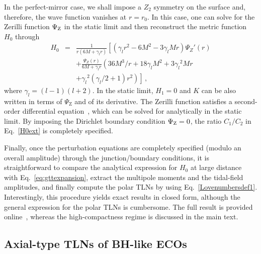 \documentclass[aps,twocolumn,showpacs,preprintnumbers,nofootinbib,prd,superscriptaddress,groupedaddress,10pt]{revtex4-1}
\def\nn{\nonumber}
\begin{document}
In the perfect-mirror case, we shall impose a $Z_2$ symmetry on the surface and, therefore, the wave function vanishes at $r=r_0$. In this case, one can solve for the Zerilli function $\Psi_{\rm Z}$ in the static limit and then reconstruct the metric function $H_0$ through~\cite{Zerilli:1970se}
\begin{eqnarray}
 H_0 &=& \frac{1}{r (6 M+{\gamma_l}  r)} \left[ \left({\gamma_l}  r^2-6 M^2-3 {\gamma_l}  M r\right) \Psi_Z'(r)\right.\nn\\
 &&\left.+\frac{\Psi_Z(r)}{6 M+{\gamma_l}  r} \left(36 M^3/r+18 {\gamma_l}  M^2+3 {\gamma_l} ^2 M r\right.\right.\nn\\
 &&\left.\left.+{\gamma_l} ^2 ({\gamma_l}/2 +1) r^2\right)\right]\,, 
\end{eqnarray}
where ${\gamma_l}=(l-1)(l+2)$. In the static limit, $H_1=0$ and $K$ can be also written in terms of $\Psi_\text{Z}$ and of its derivative. The Zerilli function satisfies a second-order differential equation~\cite{Zerilli:1970se}, which can be solved for analytically in the static limit.
By imposing the Dirichlet boundary condition $\Psi_{\rm Z}=0$, the ratio $C_1/C_2$ in Eq.~\eqref{H0ext} is completely specified.


Finally, once the perturbation equations are completely specified (modulo an overall amplitude) through the junction/boundary conditions, it is straightforward to compare the analytical expression for $H_0$ at large distance with Eq.~\eqref{eq:gttexpansion}, extract the multipole moments and the tidal-field amplitudes, and finally compute the polar TLNs by using Eq.~\eqref{Lovenumbersdef1}.
%
Interestingly, this procedure yields exact results in closed form, although the general expression for the polar TLNs is cumbersome. The full result is provided online~\cite{webpage}, whereas the high-compactness regime is discussed in the main text.


\subsection{Axial-type TLNs of BH-like ECOs}

\end{document}
